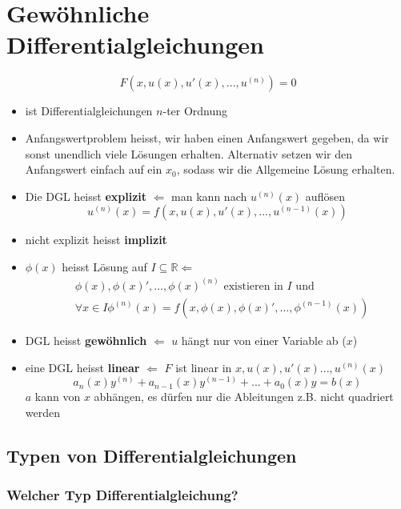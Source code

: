 \documentclass[a4paper]{article}
\newcommand{\R}{\mathbb{R}}
\begin{document}
\section{Gewöhnliche Differentialgleichungen}
\[
	F(x, u(x), u'(x), ..., u ^{(n)}) = 0
\] 
\begin{itemize}
	\item ist Differentialgleichungen $n$-ter Ordnung
	\item Anfangswertproblem heisst, wir haben einen Anfangswert gegeben,
		da wir sonst unendlich viele Lösungen erhalten. Alternativ
		setzen wir den Anfangswert einfach auf ein $x_0$, sodass wir
		die Allgemeine Lösung erhalten.
	\item Die DGL heisst \textbf{explizit}
		$\Leftarrow$ man kann nach $u ^{(n)} (x)$ auflösen
		\[
			u ^{(n)} (x) =
			f(
				x,
				u(x),
				u'(x),
				...,
				u ^{(n-1)} (x)
			)
		\] 
	\item nicht explizit heisst \textbf{implizit} 
	\item $\phi (x)$ heisst Lösung auf $I \subseteq \R \Leftarrow$
		\begin{align*}
			& \phi(x),
			\phi(x)',
			...,
			\phi(x) ^{(n)}
			\text{ existieren in } I \text{ und } \\
			&
			\forall x \in I
			\phi ^{(n)} (x) =
			f(
				x,
				\phi(x),
				\phi(x)',
				...,
				\phi ^{(n-1)} (x)
			)
		\end{align*}
	\item DGL heisst \textbf{gewöhnlich} $\Leftarrow$
		$u$ hängt nur von einer Variable ab ($x$)
	\item eine DGL heisst \textbf{linear} $\Leftarrow$
		$F$ ist linear in $x, u(x), u'(x) ..., u ^{(n)} (x)$
		\[
			a_n (x) y ^{(n)} +
			a_{n-1} (x) y ^{(n-1)} +
			... + 
			a_{0} (x) y
			= b(x)
		\] 
		$a$ kann von $x$ abhängen, es dürfen nur die Ableitungen
		z.B. nicht quadriert werden
\end{itemize}

\subsection{Typen von Differentialgleichungen}
\subsubsection{Welcher Typ Differentialgleichung?}
\end{document}
